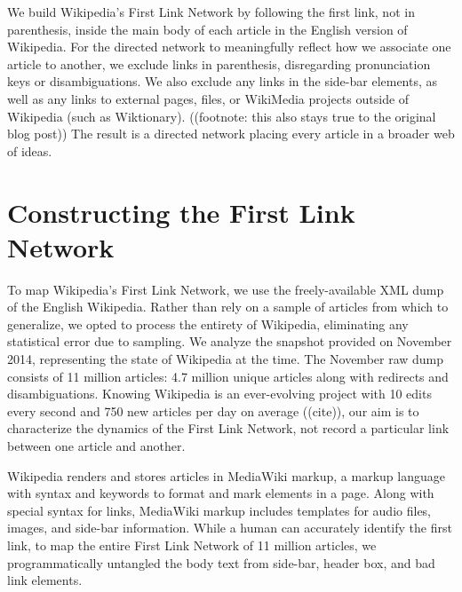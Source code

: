 \documentclass[twoside]{article}
\begin{document}
We build Wikipedia's First Link Network by following the first link, not in parenthesis, inside the main body of each article in the English version of Wikipedia. 
For the directed network to meaningfully reflect how we associate one article to another, we exclude links in parenthesis, 
disregarding pronunciation keys or disambiguations.
We also exclude any links in the side-bar elements, as well as any links to external pages, files, or WikiMedia 
projects outside of Wikipedia (such as Wiktionary).
((footnote: this also stays true to the original blog post))
The result is a directed network placing every article in a broader web of ideas.


\section{Constructing the First Link Network}

To map Wikipedia's First Link Network, we use the freely-available XML dump of the English Wikipedia. 
Rather than rely on a sample of articles from which to generalize, we opted to process the entirety of Wikipedia, 
eliminating any statistical error due to sampling.
We analyze the snapshot provided on November 2014, representing the state of Wikipedia at the time.
The November raw dump consists of 11 million articles: 4.7 million unique articles along with redirects
and disambiguations.
Knowing Wikipedia is an ever-evolving project with 10 edits every second and 750 new articles per day on average
((cite)), our aim is to characterize the dynamics of the First Link Network, not record a particular link between one
article and another.

Wikipedia renders and stores articles in MediaWiki markup, a markup language with syntax and keywords to format and mark elements in a page. Along with special syntax for links, MediaWiki markup includes templates for audio files, images, and side-bar
information.
While a human can accurately identify the first link, to map the entire First Link Network of 11 million articles, we programmatically untangled the body text from side-bar, header box, and bad link elements.
\end{document}
